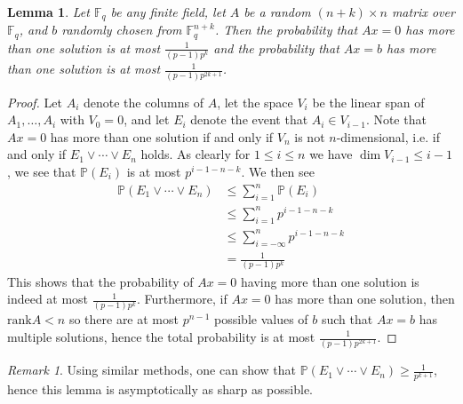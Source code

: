 \documentclass[12pt]{article}
\renewcommand{\P}{\mathbb{P}}
\newcommand{\F}{\mathbb{F}}
\theoremstyle{plain}
\newtheorem{lem}[thm]{Lemma} %
\theoremstyle{definition}
\theoremstyle{remark}
\newtheorem{rem}[thm]{Remark} %
\begin{document}
\begin{lem}
\label{lem:probindep}
Let $\F_q$ be any finite field, let $A$ be a random $(n+k)\times n$ matrix over $\F_q$, and $b$ randomly chosen from $\F_q^{n+k}$. Then the probability that $Ax=0$ has more than one solution is at most $\frac{1}{(p-1)p^k}$ and the probability that $Ax=b$ has more than one solution is at most $\frac{1}{(p-1)p^{2k+1}}$.
\end{lem}
\begin{proof}
Let $A_i$ denote the columns of $A$, let the space $V_i$ be the linear span of $A_1,\dots,A_i$ with $V_0 = 0$, and let $E_i$ denote the event that $A_i \in V_{i-1}$. Note that $Ax = 0$ has more than one solution if and only if $V_n$ is not $n$-dimensional, i.e. if and only if $E_1 \vee \cdots \vee E_n$ holds. As clearly for $1\leq i \leq n$ we have $\dim V_{i-1} \leq i-1$, we see that $\P(E_i)$ is at most $p^{i-1-n-k}$. We then see
\begin{align*}
\P(E_1 \vee \cdots \vee E_n) &\leq \sum_{i=1}^n \P(E_i)\\
&\leq \sum_{i=1}^n p^{i-1-n-k}\\
&\leq \sum_{i=-\infty}^n p^{i-1-n-k}\\
&= \frac{1}{(p-1)p^k}
\end{align*}
This shows that the probability of $Ax = 0$ having more than one solution is indeed at most $\frac{1}{(p-1)p^k}$. Furthermore, if $Ax = 0$ has more than one solution, then $\text{rank} A < n$ so there are at most $p^{n-1}$ possible values of $b$ such that $Ax = b$ has multiple solutions, hence the total probability is at most $\frac{1}{(p-1)p^{2k+1}}$.
\end{proof}
\begin{rem}
Using similar methods, one can show that $\P(E_1 \vee \cdots \vee E_n) \geq \frac{1}{p^{k+1}}$, hence this lemma is asymptotically as sharp as possible.
\end{rem}
\end{document}
